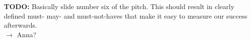 \textbf{TODO:} Basically slide number six of the pitch.
This should result in clearly defined must- may- and must-not-haves that make it easy to measure our success afterwards. \\
$\rightarrow$ Anna?